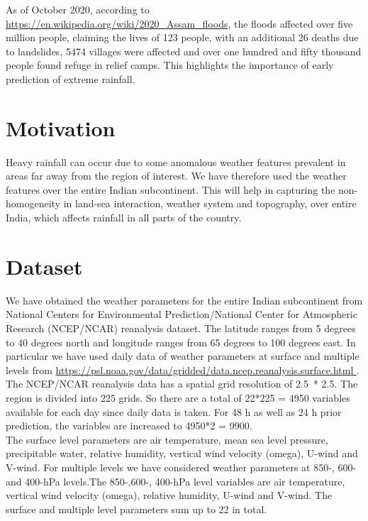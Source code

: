 \documentclass[11pt,a4paper]{article}
\begin{document}
As of October 2020, according to \url{https://en.wikipedia.org/wiki/2020_Assam_floods}, the floods affected over five million people, claiming the lives of 123 people, with an additional 26 deaths due to landslides, 5474 villages were affected and over one hundred and fifty thousand people found refuge in relief camps. This highlights the importance of early prediction of extreme rainfall.

\section{Motivation} 
Heavy rainfall can occur due to some anomalous weather features prevalent in areas far away from the region of interest. We have therefore used the weather features over the entire Indian subcontinent. This will help in capturing the non-homogeneity in land-sea interaction, weather system and topography, over entire India, which affects rainfall in all parts of the country. 


\section{Dataset}
We have obtained the weather parameters for the entire Indian subcontinent from National Centers for Environmental Prediction/National Center for Atmospheric Research (NCEP/NCAR) reanalysis dataset. The latitude ranges from 5 degrees to 40 degrees north and longitude ranges from 65 degrees to 100 degrees east. In particular we have used daily data of weather parameters at surface and multiple levels from \url{https://psl.noaa.gov/data/gridded/data.ncep.reanalysis.surface.html }.\\

The NCEP/NCAR reanalysis data has a spatial grid resolution of 2.5\textdegree \  * 2.5\textdegree. The region is divided into 225 grids. So there are a total of 22*225 = 4950 variables available for each day since daily data is taken. For 48 h as well as 24 h prior prediction, the variables are increased to 4950*2 = 9900. \\

The surface level parameters are air temperature, mean sea level pressure, precipitable water, relative humidity, vertical wind velocity (omega), U-wind and V-wind. For multiple levels we have considered weather parameters at 850-, 600- and 400-hPa levels.The 850-,600-, 400-hPa level variables are air temperature, vertical wind velocity (omega),
 relative humidity, U-wind and V-wind. The surface and multiple level parameters sum up to 22 in total.
\medskip
\end{document}
